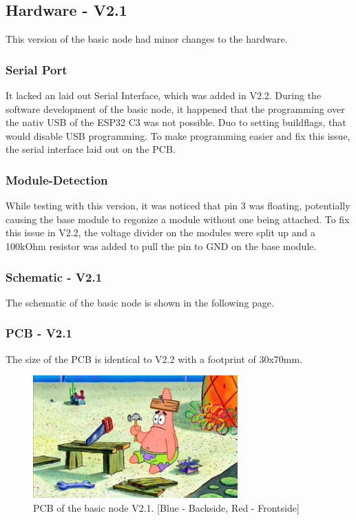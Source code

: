 \subsection{Hardware - V2.1}

    This version of the basic node had minor changes to the hardware. 

    \subsubsection{Serial Port}

        It lacked an laid out Serial Interface, which was added in V2.2.
        During the software development of the basic node, it happened that the 
        programming over the nativ USB of the ESP32 C3 was not possible. Duo to 
        setting buildflags, that would disable USB programming. To make programming
        easier and fix this issue, the serial interface laid out on the PCB. 


    \subsubsection{Module-Detection}
        While testing with this version, it was noticed that pin 3 was floating,
        potentially causing the base module to regonize a module without one being attached.
        To fix this issue in V2.2, the voltage divider on the modules were split up and
        a 100kOhm resistor was added to pull the pin to GND on the base module.

    \subsubsection{Schematic - V2.1}
        The schematic of the basic node is shown in the following page.
        

    \subsubsection{PCB - V2.1}
        The size of the PCB is identical to V2.2 with a footprint of 30x70mm. 

    \begin{figure}[H]
        \centering
        \includegraphics[width=0.7\textwidth]{assets/HW/TBD.png}
        \caption{PCB of the basic node V2.1. [Blue - Backside, Red - Frontside]}
    \end{figure}


